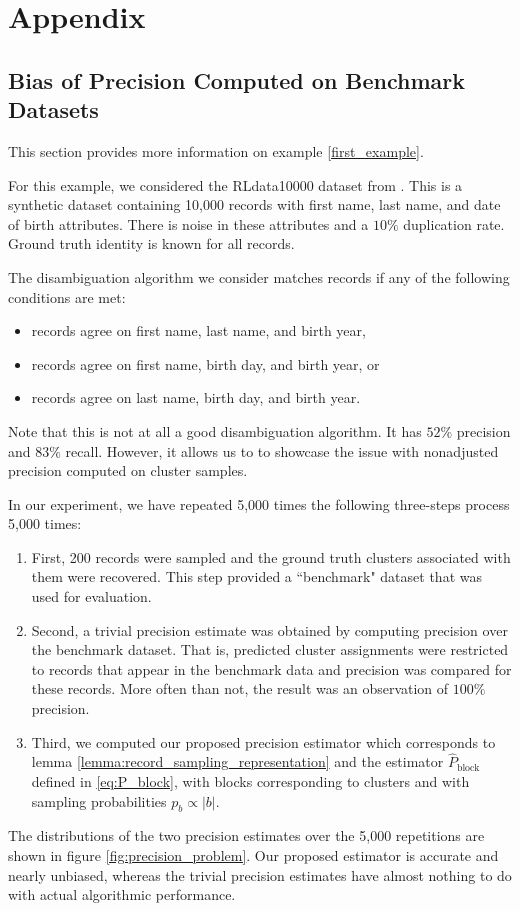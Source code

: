 \documentclass[fontsize=11pt]{article}
\theoremstyle{definition}
\begin{document}
\appendix

\section{Appendix}\label{sec:appendix}

\subsection{Bias of Precision Computed on Benchmark Datasets}\label{appendix:example}

This section provides more information on example \ref{first_example}.

For this example, we considered the RLdata10000 dataset from \cite{RecordLinkage}. This is a synthetic dataset containing 10,000 records with first name, last name, and date of birth attributes. There is noise in these attributes and a $10\%$ duplication rate. Ground truth identity is known for all records.

The disambiguation algorithm we consider matches records if any of the following conditions are met:
\begin{itemize}
    \item records agree on first name, last name, and birth year,
    \item records agree on first name, birth day, and birth year, or
    \item records agree on last name, birth day, and birth year.
\end{itemize}
Note that this is not at all a good disambiguation algorithm. It has $52\%$ precision and $83\%$ recall. However, it allows us to to showcase the issue with nonadjusted precision computed on cluster samples.

In our experiment, we have repeated 5,000 times the following three-steps process 5,000 times:
\begin{enumerate}
    \item First, 200 records were sampled and the ground truth clusters associated with them were recovered. This step provided a ``benchmark" dataset that was used for evaluation.
    \item Second, a trivial precision estimate was obtained by computing precision over the benchmark dataset. That is, predicted cluster assignments were restricted to records that appear in the benchmark data and precision was compared for these records. More often than not, the result was an observation of $100\%$ precision.
    \item Third, we computed our proposed precision estimator which corresponds to lemma \ref{lemma:record_sampling_representation} and the estimator $\widehat P_{\text{block}}$ defined in \eqref{eq:P_block}, with blocks corresponding to clusters and with sampling probabilities $p_b \propto \lvert b \rvert$.
\end{enumerate}
The distributions of the two precision estimates over the 5,000 repetitions are shown in figure \ref{fig:precision_problem}. Our proposed estimator is accurate and nearly unbiased, whereas the trivial precision estimates have almost nothing to do with actual algorithmic performance.
\end{document}
